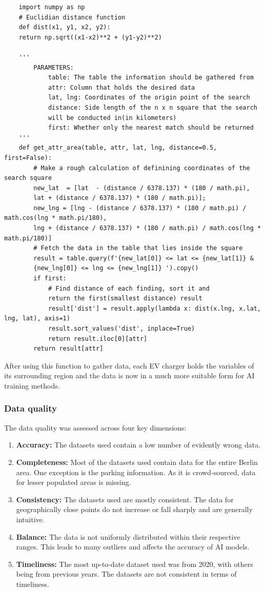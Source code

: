 \begin{verbatim}
    import numpy as np
    # Euclidian distance function
    def dist(x1, y1, x2, y2):
    return np.sqrt((x1-x2)**2 + (y1-y2)**2)

    '''
        PARAMETERS:
            table: The table the information should be gathered from
            attr: Column that holds the desired data
            lat, lng: Coordinates of the origin point of the search
            distance: Side length of the n x n square that the search 
            will be conducted in(in kilometers)
            first: Whether only the nearest match should be returned
    '''
    def get_attr_area(table, attr, lat, lng, distance=0.5, first=False):
        # Make a rough calculation of definining coordinates of the search square
        new_lat  = [lat  - (distance / 6378.137) * (180 / math.pi), 
        lat + (distance / 6378.137) * (180 / math.pi)];
        new_lng = [lng - (distance / 6378.137) * (180 / math.pi) / math.cos(lng * math.pi/180), 
        lng + (distance / 6378.137) * (180 / math.pi) / math.cos(lng * math.pi/180)]
        # Fetch the data in the table that lies inside the square
        result = table.query(f'{new_lat[0]} <= lat <= {new_lat[1]} & 
        {new_lng[0]} <= lng <= {new_lng[1]} ').copy()
        if first:
            # Find distance of each finding, sort it and 
            return the first(smallest distance) result
            result['dist'] = result.apply(lambda x: dist(x.lng, x.lat, lng, lat), axis=1)
            result.sort_values('dist', inplace=True)
            return result.iloc[0][attr]
        return result[attr]
\end{verbatim}
After using this function to gather data, each EV charger holds the variables of its surrounding region and the data is now in a much more suitable form for AI training methods.
\subsubsection{Data quality}
The data quality was assessed across four key dimensions:
\begin{enumerate}
    \item \textbf{Accuracy:} The datasets used contain a low number of evidently wrong data.
    \item \textbf{Completeness:} Most of the datasets used contain data for the entire Berlin area. One exception is the parking information. As it is crowd-sourced, data for lesser populated areas is missing.
    \item \textbf{Consistency:} The datasets used are mostly consistent. The data for geographically close points do not increase or fall sharply and are generally intuitive.
    \item \textbf{Balance:} The data is not uniformly distributed within their respective ranges. This leads to many outliers and affects the accuracy of AI models.
    \item \textbf{Timeliness:} The most up-to-date dataset used was from 2020, with others being from previous years. The datasets are not consistent in terms of timeliness.
\end{enumerate}
